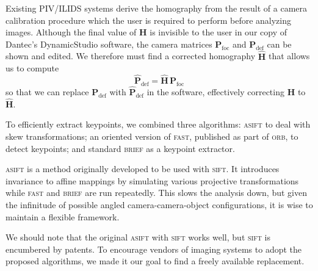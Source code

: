 \documentclass[11.5pt,oneside]{book}
\begin{document}
Existing PIV/ILIDS systems derive the homography from the result of a camera
calibration procedure which the user is required to perform before analyzing
images.
Although the final value of $\mathbf{H}$ is invisible to the user in our copy of
Dantec's DynamicStudio software, the camera matrices $\mathbf{P}_\text{foc}$ and
$\mathbf{P}_\text{def}$ can be shown and edited. We therefore must find a
corrected homography $\mathbf{\hat{H}}$ that allows us to compute
\begin{equation}
    \mathbf{\hat{P}}_\text{def} = \mathbf{\hat{H}} \, \mathbf{P}_\text{foc}
    \label{corrected-homography-use}
\end{equation}
so that we can replace $\mathbf{P}_\text{def}$ with $\mathbf{\hat{P}}_\text{def}$ in
the software, effectively correcting $\mathbf{H}$ to $\mathbf{\hat{H}}$.

To efficiently extract keypoints, we combined three algorithms:
\textsc{asift} \cite{Morel09} to deal with skew transformations; an oriented version of
\textsc{fast}, published as part of \textsc{orb}, to detect keypoints; and
standard \textsc{brief} as a keypoint extractor.

\textsc{asift} is a method originally developed to be used with \textsc{sift}.
It introduces invariance to affine mappings by simulating various
projective transformations while \textsc{fast} and \textsc{brief} are run repeatedly.
This slows the analysis down, but given the infinitude of
possible angled camera-camera-object configurations, it is wise to maintain a
flexible framework.

We should note that the original \textsc{asift} with
\textsc{sift} works well, but \textsc{sift} is encumbered by patents. To
encourage vendors of imaging systems to adopt the proposed algorithms, we made
it our goal to find a freely available replacement.
\end{document}
